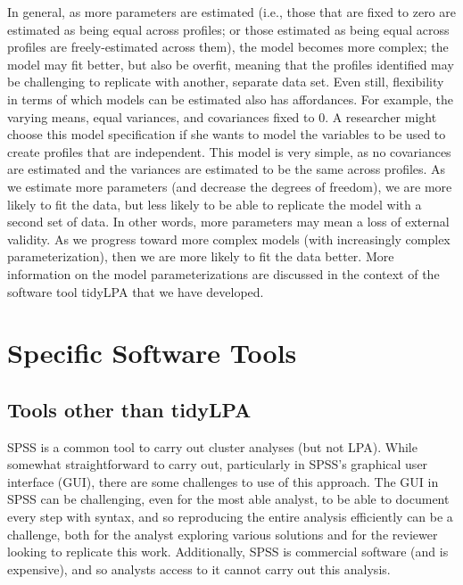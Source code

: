 \documentclass[man]{apa6}
\begin{document}
In general, as more parameters are estimated (i.e., those that are fixed to zero
are estimated as being equal across profiles; or those estimated as being equal
across profiles are freely-estimated across them), the model becomes more
complex; the model may fit better, but also be overfit, meaning that the
profiles identified may be challenging to replicate with another, separate data
set. Even still, flexibility in terms of which models can be estimated also has
affordances. For example, the varying means, equal variances, and covariances
fixed to 0. A researcher might choose this model specification if she wants to
model the variables to be used to create profiles that are independent. This
model is very simple, as no covariances are estimated and the variances are
estimated to be the same across profiles. As we estimate more parameters (and
decrease the degrees of freedom), we are more likely to fit the data, but less
likely to be able to replicate the model with a second set of data. In other
words, more parameters may mean a loss of external validity. As we progress
toward more complex models (with increasingly complex parameterization), then we
are more likely to fit the data better. More information on the model
parameterizations are discussed in the context of the software tool tidyLPA that
we have developed.

\hypertarget{specific-software-tools}{%
\section{Specific Software Tools}\label{specific-software-tools}}

\hypertarget{tools-other-than-tidylpa}{%
\subsection{Tools other than tidyLPA}\label{tools-other-than-tidylpa}}

SPSS is a common tool to carry out cluster analyses (but not LPA). While
somewhat straightforward to carry out, particularly in SPSS's graphical user
interface (GUI), there are some challenges to use of this approach. The GUI in
SPSS can be challenging, even for the most able analyst, to be able to document
every step with syntax, and so reproducing the entire analysis efficiently can
be a challenge, both for the analyst exploring various solutions and for the
reviewer looking to replicate this work. Additionally, SPSS is commercial
software (and is expensive), and so analysts access to it cannot carry out this
analysis.
\end{document}
